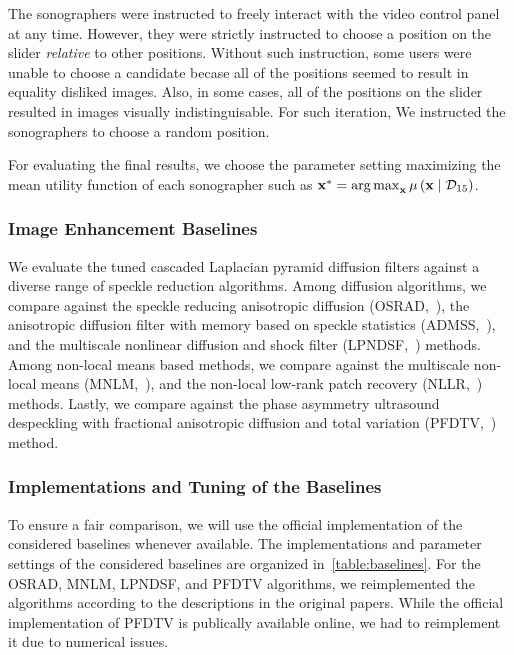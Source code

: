 The sonographers were instructed to freely interact with the video control panel at any time.
However, they were strictly instructed to choose a position on the slider \textit{relative} to other positions.
Without such instruction, some users were unable to choose a candidate becase all of the positions seemed to result in equality disliked images.
Also, in some cases, all of the positions on the slider resulted in images visually indistinguisable.
For such iteration, We instructed the sonographers to choose a random position.

For evaluating the final results, we choose the parameter setting maximizing the mean utility function of each sonographer such as \( \mathbf{x}^* = \operatorname*{arg\,max}_{\mathbf{x}} \mu\left(\mathbf{x} \mid \mathcal{D}_{15} \right) \).

\subsubsection{Image Enhancement Baselines}
We evaluate the tuned cascaded Laplacian pyramid diffusion filters against a diverse range of speckle reduction algorithms.
Among diffusion algorithms, we compare against the speckle reducing anisotropic diffusion (OSRAD,~\cite{krissian_oriented_2007}), the anisotropic diffusion filter with memory based on speckle statistics (ADMSS,~\cite{ramos-llorden_anisotropic_2015}), and the multiscale nonlinear diffusion and shock filter (LPNDSF,~\cite{zhang_multiscale_2006}) methods.
Among non-local means based methods, we compare against the multiscale non-local means (MNLM,~\cite{breivik_realtime_2017}), and the non-local low-rank patch recovery (NLLR,~\cite{zhu_nonlocal_2017}) methods.
Lastly, we compare against the phase asymmetry ultrasound despeckling with fractional anisotropic diffusion and total variation (PFDTV,~\cite{mei_phase_2020}) method.


%
\subsubsection{Implementations and Tuning of the Baselines}
To ensure a fair comparison, we will use the official implementation of the considered baselines whenever available.
The implementations and parameter settings of the considered baselines are organized in~\cref{table:baselines}.
For the OSRAD, MNLM, LPNDSF, and PFDTV algorithms, we reimplemented the algorithms according to the descriptions in the original papers.
While the official implementation of PFDTV is publically available online, we had to reimplement it due to numerical issues.

